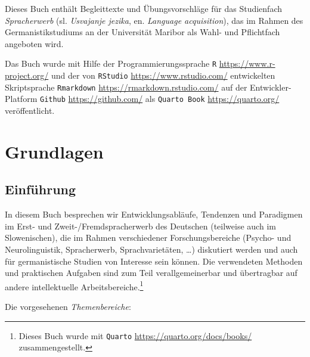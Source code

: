 \documentclass[
  letterpaper,
]{scrbook}
\begin{document}

Dieses Buch enthält Begleittexte und Übungsvorschläge für das
Studienfach \emph{Spracherwerb} (sl. \emph{Usvajanje jezika}, en.
\emph{Language acquisition}), das im Rahmen des Germanistikstudiums an
der Universität Maribor als Wahl- und Pflichtfach angeboten wird.

Das Buch wurde mit Hilfe der Programmierungssprache \texttt{R}
\url{https://www.r-project.org/} und der von \texttt{RStudio}
\url{https://www.rstudio.com/} entwickelten Skriptsprache
\texttt{Rmarkdown} \url{https://rmarkdown.rstudio.com/} auf der
Entwickler-Platform \texttt{Github} \url{https://github.com/} als
\texttt{Quarto\ Book} \url{https://quarto.org/} veröffentlicht.

\part{Grundlagen}

\hypertarget{sec-einfuhrung}{%
\chapter{Einführung}\label{sec-einfuhrung}}

In diesem Buch besprechen wir Entwicklungsabläufe, Tendenzen und
Paradigmen im Erst- und Zweit-/Fremdspracherwerb des Deutschen
(teilweise auch im Slowenischen), die im Rahmen verschiedener
Forschungsbereiche (Psycho- und Neurolinguistik, Spracherwerb,
Sprachvarietäten, \ldots) diskutiert werden und auch für germanistische
Studien von Interesse sein können. Die verwendeten Methoden und
praktischen Aufgaben sind zum Teil verallgemeinerbar und übertragbar auf
andere intellektuelle Arbeitsbereiche.\footnote{Dieses Buch wurde mit
  \texttt{Quarto} \url{https://quarto.org/docs/books/} zusammengestellt.}

Die vorgesehenen \emph{Themenbereiche}:\\
\end{document}
